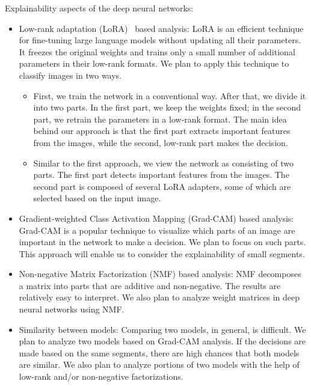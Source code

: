 \documentclass[a4paper,11pt]{article}
\begin{document}
Explainability aspects of the deep neural networks:
\begin{itemize}
	\item Low-rank adaptation (LoRA)~\cite{hu2021loralowrankadaptationlarge} based analysis: LoRA is an efficient technique for fine-tuning large language models without updating all their parameters. It freezes the original weights and trains only a small number of additional parameters in their low-rank formats. We plan to apply this technique to classify images in two ways.
	\begin{itemize}
		\item First, we train the network in a conventional way. After that, we divide it into two parts. In the first part, we keep the weights fixed; in the second part, we retrain the parameters in a low-rank format. The main idea behind our approach is that the first part extracts important features from the images, while the second, low-rank part makes the decision.
		
		\item Similar to the first approach, we view the network as consisting of two parts. The first part detects important features from the images. The second part is composed of several LoRA adapters, some of which are selected based on the input image.
	\end{itemize}
	\item Gradient-weighted Class Activation Mapping (Grad-CAM) based analysis: Grad-CAM is a popular technique to visualize which parts of an image are important in the network to make a decision. We plan to focus on such parts. This approach will enable us to consider the explainability of small segments.
	
	\item Non-negative Matrix Factorization (NMF) based analysis: NMF decomposes a matrix into parts that are additive and non-negative. The results are relatively easy to interpret. We also plan to analyze weight matrices in deep neural networks using NMF.
	
	\item Similarity between models: Comparing two models, in general, is difficult. We plan to analyze two models based on Grad-CAM analysis. If the decisions are made based on the same segments, there are high chances that both models are similar. We also plan to analyze portions of two models with the help of low-rank and/or non-negative factorizations.
\end{itemize}
\end{document}
